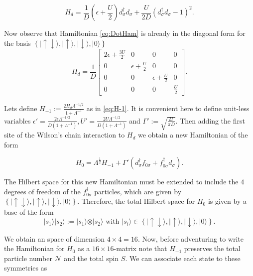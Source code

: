 \begin{equation}
H_{d}=\frac{1}{D}\left(\epsilon+\frac{U}{2}\right)d_{\sigma}^{\dagger}d_{\sigma}+\frac{U}{2D}(d_{\sigma}^{\dagger}d_{\sigma}-1)^{2}.\label{eq:DotHam}
\end{equation}


\noindent Now observe that Hamiltonian \eqref{eq:DotHam} is already in the
diagonal form for the basis $\left\{ \vert\uparrow\!\downarrow\rangle,\vert\uparrow\rangle,\vert\downarrow\rangle,\vert0\rangle\right\} $
\[
H_{d}=\frac{1}{D}\left[\begin{array}{cccc}
2\epsilon+\frac{3U}{2} & 0 & 0 & 0\\
0 & \epsilon+\frac{U}{2} & 0 & 0\\
0 & 0 & \epsilon+\frac{U}{2} & 0\\
0 & 0 & 0 & \frac{U}{2}
\end{array}\right].
\]


Lets define $H_{-1} := \frac{2 H_d \Lambda^{-1/2}}{1+\Lambda^{-1}}$ as in \ref{eq:H-1}. It is convenient here to define unit-less variables $\epsilon' =\frac{2\epsilon \Lambda^{-1/2}}{D(1+\Lambda^{-1})}, U'= \frac{2U\Lambda^{-1/2}}{D(1+\Lambda^{-1})}$ and $\Gamma':=\sqrt{\frac{2\Gamma}{\pi D}}$. Then adding the first site of the Wilson's chain interaction to $H_{d}$ we obtain a new Hamiltonian of the form 

\begin{equation}
H_{0}=\Lambda^{\frac{1}{2}}H_{-1}+\Gamma'\left(d_{\sigma}^{\dagger}f_{0\sigma}+f_{0\sigma}^{\dagger}d_{\sigma}\right).\label{eq:H0fromH-1}
\end{equation}



The Hilbert space for this new Hamiltonian must be extended to include
the $4$ degrees of freedom of the $f_{0\sigma}^{\dagger}$ particles,
which are given by $\left\{ \vert\uparrow\!\downarrow\rangle,\vert\uparrow\rangle,\vert\downarrow\rangle,\vert0\rangle\right\} $.
Therefore, the total Hilbert space for $H_{0}$ is given by a base
of the form 
\[
\vert s_{1}\rangle\vert s_{2}\rangle:=\vert s_{1}\rangle\otimes\vert s_{2}\rangle\mbox{ with }\vert s_{i}\rangle\in\left\{ \vert\uparrow\!\downarrow\rangle,\vert\uparrow\rangle,\vert\downarrow\rangle,\vert0\rangle\right\} .
\]


\noindent We obtain an space of dimension $4\times4=16.$ Now, before adventuring
to write the Hamiltonian for $H_{0}$ as a $16\times16$-matrix note
that $H_{-1}$ preserves the total particle number $\mathcal{N}$ and the total spin $S$. We can associate each state to these symmetries as 

